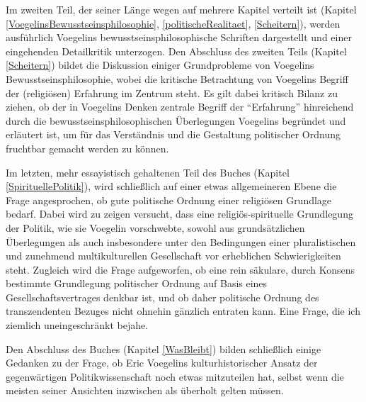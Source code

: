 Im zweiten Teil, der seiner Länge wegen auf mehrere Kapitel verteilt ist
(Kapitel \ref{VoegelinsBewusstseinsphilosophie}, \ref{politischeRealitaet},
\ref{Scheitern}), werden ausführlich Voegelins bewusstseinsphilosophische
Schriften dargestellt und einer eingehenden Detailkritik unterzogen. Den
Abschluss des zweiten Teils (Kapitel \ref{Scheitern}) bildet die Diskussion
einiger Grundprobleme von Voegelins Bewusstseinsphilosophie, wobei die
kritische Betrachtung von Voegelins Begriff der (religiösen) Erfahrung im
Zentrum steht. Es gilt dabei kritisch Bilanz zu ziehen, ob der in Voegelins
Denken zentrale Begriff der "`Erfahrung"' hinreichend durch die
bewusstseinsphilosophischen Überlegungen Voegelins begründet und erläutert
ist, um für das Verständnis und die Gestaltung politischer Ordnung fruchtbar
gemacht werden zu können.

Im letzten, mehr essayistisch gehaltenen Teil des Buches (Kapitel
\ref{SpirituellePolitik}), wird schließlich auf einer etwas allgemeineren
Ebene die Frage angesprochen, ob gute politische Ordnung einer religiösen
Grundlage bedarf. Dabei wird zu zeigen versucht, dass eine
religiös-spirituelle Grundlegung der Politik, wie sie Voegelin vorschwebte,
sowohl aus grundsätzlichen Überlegungen als auch insbesondere unter den
Bedingungen einer pluralistischen und zunehmend multikulturellen Gesellschaft
vor erheblichen Schwierigkeiten steht. Zugleich wird die Frage aufgeworfen, ob
eine rein säkulare, durch Konsens bestimmte Grundlegung politischer Ordnung
auf Basis eines Gesellschaftsvertrages denkbar ist, und ob daher politische
Ordnung des transzendenten Bezuges nicht ohnehin gänzlich entraten kann. Eine
Frage, die ich ziemlich uneingeschränkt bejahe.

Den Abschluss des Buches (Kapitel \ref{WasBleibt}) bilden schließlich einige
Gedanken zu der Frage, ob Eric Voegelins kulturhistorischer Ansatz der
gegenwärtigen Politikwissenschaft noch etwas mitzuteilen hat, selbst wenn die
meisten seiner Ansichten inzwischen als überholt gelten müssen.


